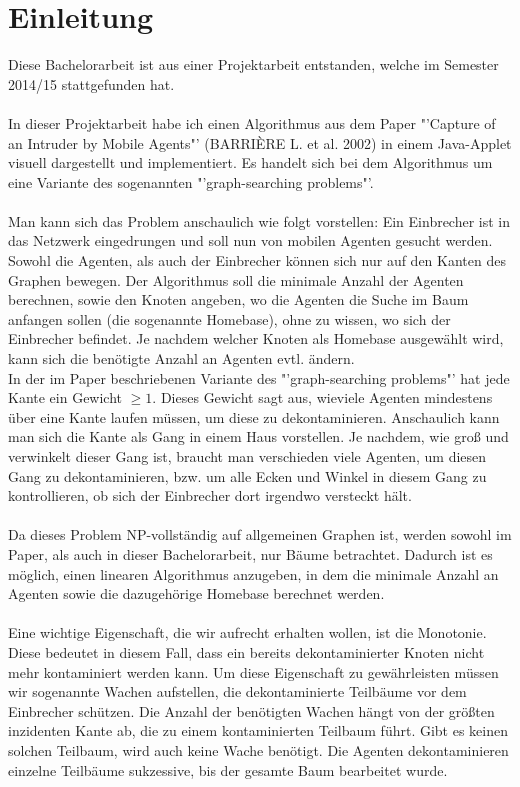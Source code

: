 \section{Einleitung}
Diese Bachelorarbeit ist aus einer Projektarbeit entstanden, welche im Semester 2014/15 stattgefunden hat.
\\
\\
In dieser Projektarbeit habe ich einen Algorithmus aus dem Paper "'Capture of an Intruder by Mobile Agents"' (BARRIÈRE L. et al. 2002) in einem Java-Applet visuell dargestellt und implementiert. Es handelt sich bei dem Algorithmus um eine Variante des sogenannten "'graph-searching problems"'.
\\
\\
Man kann sich das Problem anschaulich wie folgt vorstellen: Ein Einbrecher ist in das Netzwerk eingedrungen und soll nun von mobilen Agenten gesucht werden. Sowohl die Agenten, als auch der Einbrecher können sich nur auf den Kanten des Graphen bewegen. Der Algorithmus soll die minimale Anzahl der Agenten berechnen, sowie den Knoten angeben, wo die Agenten die Suche im Baum anfangen sollen (die sogenannte Homebase), ohne zu wissen, wo sich der Einbrecher befindet. Je nachdem welcher Knoten als Homebase ausgewählt wird, kann sich die benötigte Anzahl an Agenten evtl. ändern.
\\
In der im Paper beschriebenen Variante des "'graph-searching problems"' hat jede Kante ein Gewicht $\geq 1$. Dieses Gewicht sagt aus, wieviele Agenten mindestens über eine Kante laufen müssen, um diese zu dekontaminieren. Anschaulich kann man sich die Kante als Gang in einem Haus vorstellen. Je nachdem, wie groß und verwinkelt dieser Gang ist, braucht man verschieden viele Agenten, um diesen Gang zu dekontaminieren, bzw. um alle Ecken und Winkel in diesem Gang zu kontrollieren, ob sich der Einbrecher dort irgendwo versteckt hält.
\\
\\
Da dieses Problem NP-vollständig auf allgemeinen Graphen ist, werden sowohl im Paper, als auch in dieser Bachelorarbeit, nur Bäume betrachtet. Dadurch ist es möglich, einen linearen Algorithmus anzugeben, in dem die minimale Anzahl an Agenten sowie die dazugehörige Homebase berechnet werden.
\\
\\
Eine wichtige Eigenschaft, die wir aufrecht erhalten wollen, ist die Monotonie. Diese bedeutet in diesem Fall, dass ein bereits dekontaminierter Knoten nicht mehr kontaminiert werden kann. Um diese Eigenschaft zu gewährleisten müssen wir sogenannte Wachen aufstellen, die dekontaminierte Teilbäume vor dem Einbrecher schützen. Die Anzahl der benötigten Wachen hängt von der größten inzidenten Kante ab, die zu einem kontaminierten Teilbaum führt. Gibt es keinen solchen Teilbaum, wird auch keine Wache benötigt. Die Agenten dekontaminieren einzelne Teilbäume sukzessive, bis der gesamte Baum bearbeitet wurde.
